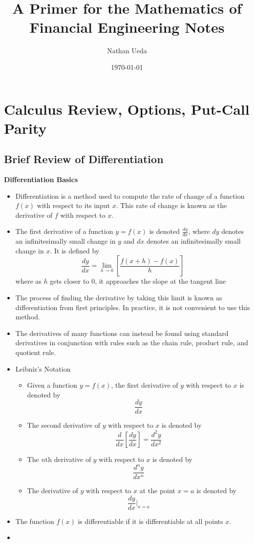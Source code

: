 \documentclass[11pt]{article}
\title{A Primer for the Mathematics of Financial Engineering Notes}
\author{Nathan Ueda}
\date{\today}
\begin{document}
\maketitle 
\pagebreak
\tableofcontents 
\pagebreak


\section{Calculus Review, Options, Put-Call Parity}
\subsection{Brief Review of Differentiation}

\textbf{Differentiation Basics}
\begin{itemize}
    \item Differentiation is a method used to compute the rate of change of a function $f(x)$
    with respect to its input $x$. This rate of change is known as the derivative of $f$ with
    respect to $x$. 
    \item The first derivative of a function $y=f(x)$ is denoted $\frac{dy}{dx}$, where $dy$
    denotes an infinitesimally small change in $y$ and $dx$ denotes an infinitesimally small 
    change in $x$. It is defined by 
    \[\frac{dy}{dx} = \lim_{h \to 0} \left[\frac{f(x+h) - f(x)}{h}\right]\]
    where as $h$ gets closer to 0, it approaches the slope at the tangent line
    \item The process of finding the derivative by taking this limit is known as 
    differentiation from first principles. In practice, it is not convenient to use this method.
    \item The derivatives of many functions can instead be found using standard derivatives in 
    conjunction with rules such as the chain rule, product rule, and quotient rule.
    \item Leibniz's Notation
    \begin{itemize}
        \item Given a function $y=f(x)$, the first derivative of $y$ with respect to $x$ is 
        denoted by 
        \[ \frac{dy}{dx} \]
        \item The second derivative of $y$ with respect to $x$ is denoted by 
        \[ \frac{d}{dx}\left[\frac{dy}{dx}\right]=\frac{d^2y}{dx^2}\]
        \item The $n$th derivative of $y$ with respect to $x$ is denoted by
        \[ \frac{d^ny}{dx^n}\]
        \item The derivative of $y$ with respect to $x$ at the point $x=a$ is denoted by 
        \[\frac{dy}{dx}|_{x=a}\]
    \end{itemize}
    \item The function $f(x)$ is differentiable if it is differentiable at all points $x$.
    \item 
\end{itemize}
\end{document}
